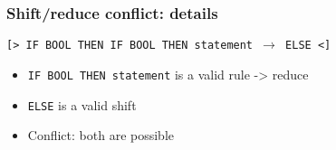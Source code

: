 \begin{frame}
  \frametitle{Shift/reduce conflict: details}
  \texttt{[> IF BOOL THEN IF BOOL THEN statement $\rightarrow$ ELSE <]}
  \begin{itemize}
    \item \texttt{IF BOOL THEN statement} is a valid rule -> reduce
    \item \texttt{ELSE} is a valid shift
    \item Conflict: both are possible
  \end{itemize}
\end{frame}
